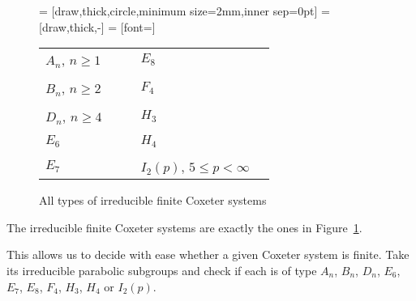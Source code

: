 \begin{figure}
	\centering
	 = [draw,thick,circle,minimum size=2mm,inner sep=0pt]
	 = [draw,thick,-]
	 = [font=\small]

	\begin{tabular}{MMcMM}
	$A_n$, {\tiny $n \geq 1$}
	&
	\An
	&
	\hspace*{\cgpadh}
	&
	$E_8$
	&
	\Eeight
	\\
	\vspace*{\cgpadv}
	\\
	$B_n$, {\tiny $n \geq 2$}
	&
	\Bn
	&
	\hspace*{\cgpadh}
	&
	$F_4$
	&
	\Ffour
	\\
	\vspace*{\cgpadv}
	\\
	$D_n$, {\tiny $n \geq 4$}
	&
	\Dn
	&
	\hspace*{\cgpadh}
	&
	$H_3$
	&
	\Hthree
	\\
	\vspace*{\cgpadv}
	\\
	$E_6$
	&
	\Esix
	&
	\hspace*{\cgpadh}
	&
	$H_4$
	&
	\Hfour
	\\
	\vspace*{\cgpadv}
	\\
	$E_7$
	&
	\Eseven
	&
	\hspace*{\cgpadh}
	&
	$I_2(p)$, {\tiny $5 \leq p < \infty$}
	&
	\Itwop
	\end{tabular}
	\caption{All types of irreducible finite Coxeter systems}
	\label{fig:finite-coxeter-systems}
\end{figure}

\begin{theo}
	The irreducible finite Coxeter systems are exactly the ones in Figure~\ref{fig:finite-coxeter-systems}.
\end{theo}

This allows us to decide with ease whether a given Coxeter system is finite. Take its irreducible parabolic subgroups and check if each is of type $A_n$, $B_n$, $D_n$, $E_6$, $E_7$, $E_8$, $F_4$, $H_3$, $H_4$ or $I_2(p)$.